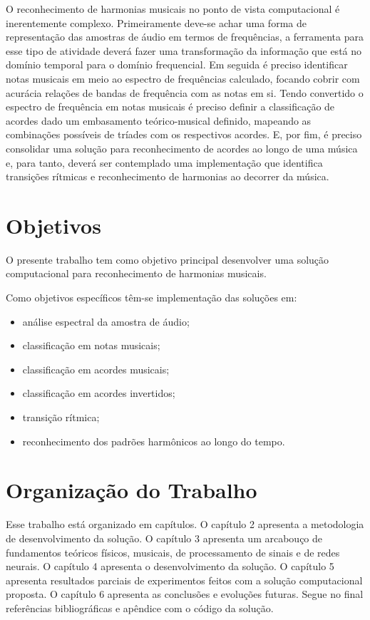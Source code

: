 O reconhecimento de harmonias musicais no ponto de vista computacional é inerentemente complexo. Primeiramente deve-se achar uma forma de representação das amostras de áudio em termos de frequências, a ferramenta para esse tipo de atividade deverá fazer uma transformação da informação que está no domínio temporal para o domínio frequencial. Em seguida é preciso identificar notas musicais em meio ao espectro de frequências calculado, focando cobrir com acurácia relações de bandas de frequência com as notas em si. Tendo convertido o espectro de frequência em notas musicais é preciso definir a classificação de acordes dado um embasamento teórico-musical definido, mapeando as combinações possíveis de tríades com os respectivos acordes. E, por fim, é preciso consolidar uma solução para reconhecimento de acordes ao longo de uma música e, para tanto, deverá ser contemplado uma implementação que identifica transições rítmicas e reconhecimento de harmonias ao decorrer da música.  

\section{Objetivos}
\label{sec:objetivos}

O presente trabalho tem como objetivo principal desenvolver uma solução computacional para reconhecimento de harmonias musicais.

Como objetivos específicos têm-se implementação das soluções em:

 	\begin{itemize}
        \item análise espectral da amostra de áudio;
        \item classificação em notas musicais;
        \item classificação em acordes musicais;
        \item classificação em acordes invertidos;
        \item transição rítmica;
        \item reconhecimento dos padrões harmônicos ao longo do tempo.
    \end{itemize}

\section{Organização do Trabalho}
\label{sec:organizacao}

Esse trabalho está organizado em capítulos. O capítulo 2 apresenta a metodologia de desenvolvimento da solução. O capítulo 3 apresenta um arcabouço de fundamentos teóricos físicos, musicais, de processamento de sinais e de redes neurais. O capítulo 4 apresenta o desenvolvimento da solução. O capítulo 5 apresenta resultados parciais de experimentos feitos com a solução computacional proposta. O capítulo 6 apresenta as conclusões e evoluções futuras. Segue no final referências bibliográficas e apêndice com o código da solução.
